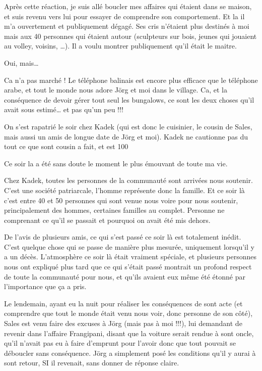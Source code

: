 Après cette réaction, je suis allé boucler mes affaires qui étaient dans se maison, et suis revenu vers lui pour essayer de comprendre son comportement. Et la il m’a ouvertement et publiquement dégagé. Ses cris n’étaient plus destinés à moi mais aux 40 personnes qui étaient autour (sculpteurs sur bois, jeunes qui jouaient au volley, voisins, …). Il a voulu montrer publiquement qu’il était le maitre.

Oui, mais…

Ca n’a pas marché ! Le téléphone balinais est encore plus efficace que le téléphone arabe, et tout le monde nous adore Jörg et moi dans le village. Ca, et la conséquence de devoir gérer tout seul les bungalows, ce sont les deux choses qu’il avait sous estimé… et pas qu’un peu !!!

On s’est rapatrié le soir chez Kadek (qui est donc le cuisinier, le cousin de Sales, mais aussi un amis de longue date de Jörg et moi). Kadek ne cautionne pas du tout ce que sont cousin a fait, et est 100%

Ce soir la a été sans doute le moment le plus émouvant de toute ma vie.

Chez Kadek, toutes les personnes de la communauté sont arrivées nous soutenir. C’est une société patriarcale, l’homme représente donc la famille. Et ce soir là c’est entre 40 et 50 personnes qui sont venue nous voire pour nous soutenir, principalement des hommes, certaines familles au complet. Personne ne comprenant ce qu’il se passait et pourquoi on avait été mis dehors.

De l’avis de plusieurs amis, ce qui s’est passé ce soir là est totalement inédit. C’est quelque chose qui se passe de manière plus mesurée, uniquement lorsqu’il y a un décès. L’atmosphère ce soir là était vraiment spéciale, et plusieurs personnes nous ont expliqué plus tard que ce qui s’était passé montrait un profond respect de toute la communauté pour nous, et qu’ils avaient eux même été étonné par l’importance que ça a pris.

Le lendemain, ayant eu la nuit pour réaliser les conséquences de sont acte (et comprendre que tout le monde était venu nous voir, donc personne de son côté), Sales est venu faire des excuses à Jörg (mais pas à moi !!!), lui demandant de revenir dans l’affaire Frangipani, disant que la voiture serait rendue à sont oncle, qu’il n’avait pas eu à faire d’emprunt pour l’avoir donc que tout pouvait se déboucler sans conséquence. Jörg a simplement posé les conditions qu’il y aurai à sont retour, SI il revenait, sans donner de réponse claire.

